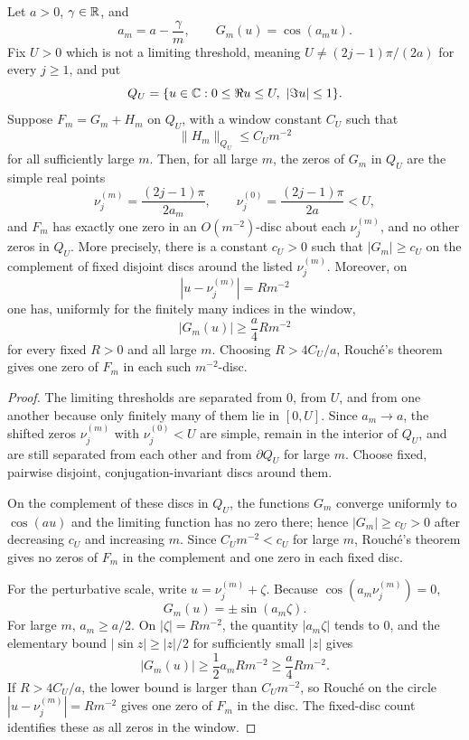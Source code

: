 \begin{lemma}\label{lem:fixed-window-rouche-isolation}
Let \(a>0\), \(\gamma\in\mathbb{R}\), and
\[
a_m=a-\frac{\gamma}{m},
\qquad
G_m(u)=\cos(a_m u).
\]
Fix \(U>0\) which is not a limiting threshold, meaning \(U\ne(2j-1)\pi/(2a)\) for every \(j\ge1\), and put
\[
Q_U=\{u\in\mathbb{C}:0\le\Re u\le U,
\ |\Im u|\le1\}.
\]
Suppose \(F_m=G_m+H_m\) on \(Q_U\), with a window constant \(C_U\) such that
\[
\|H_m\|_{Q_U}\le C_Um^{-2}
\]
for all sufficiently large \(m\).  Then, for all large \(m\), the zeros of \(G_m\) in \(Q_U\) are the simple real points
\[
\nu_j^{(m)}=\frac{(2j-1)\pi}{2a_m},
\qquad
\nu_j^{(0)}=\frac{(2j-1)\pi}{2a}<U,
\]
and \(F_m\) has exactly one zero in an \(O(m^{-2})\)-disc about each \(\nu_j^{(m)}\), and no other zeros in \(Q_U\).  More precisely, there is a constant \(c_U>0\) such that \(|G_m|\ge c_U\) on the complement of fixed disjoint discs around the listed \(\nu_j^{(m)}\).  Moreover, on
\[
|u-\nu_j^{(m)}|=Rm^{-2}
\]
one has, uniformly for the finitely many indices in the window,
\begin{equation}\label{eq:fixed-window-rouche-lower-bound}
|G_m(u)|\ge \frac a4 Rm^{-2}
\end{equation}
for every fixed \(R>0\) and all large \(m\).  Choosing \(R>4C_U/a\), Rouch\'e's theorem gives one zero of \(F_m\) in each such \(m^{-2}\)-disc.
\end{lemma}
\begin{proof}
The limiting thresholds are separated from \(0\), from \(U\), and from one another because only finitely many of them lie in \([0,U]\).  Since \(a_m\to a\), the shifted zeros \(\nu_j^{(m)}\) with \(\nu_j^{(0)}<U\) are simple, remain in the interior of \(Q_U\), and are still separated from each other and from \(\partial Q_U\) for large \(m\).  Choose fixed, pairwise disjoint, conjugation-invariant discs around them.

On the complement of these discs in \(Q_U\), the functions \(G_m\) converge uniformly to \(\cos(au)\) and the limiting function has no zero there; hence \(|G_m|\ge c_U>0\) after decreasing \(c_U\) and increasing \(m\).  Since \(C_Um^{-2}<c_U\) for large \(m\), Rouch\'e's theorem gives no zeros of \(F_m\) in the complement and one zero in each fixed disc.

For the perturbative scale, write \(u=\nu_j^{(m)}+\zeta\).  Because \(\cos(a_m\nu_j^{(m)})=0\),
\[
G_m(u)=\pm\sin(a_m\zeta).
\]
For large \(m\), \(a_m\ge a/2\).  On \(|\zeta|=Rm^{-2}\), the quantity \(|a_m\zeta|\) tends to \(0\), and the elementary bound \(|\sin z|\ge |z|/2\) for sufficiently small \(|z|\) gives
\[
|G_m(u)|\ge \frac12 a_m Rm^{-2}\ge\frac a4 Rm^{-2}.
\]
If \(R>4C_U/a\), the lower bound is larger than \(C_Um^{-2}\), so Rouch\'e on the circle \(|u-\nu_j^{(m)}|=Rm^{-2}\) gives one zero of \(F_m\) in the disc.  The fixed-disc count identifies these as all zeros in the window.
\end{proof}

